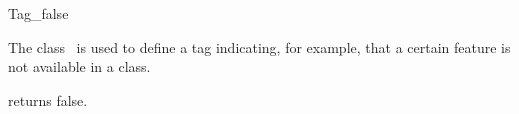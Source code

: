 \begin{ccRefClass}{Tag_false}

\ccDefinition

The class \ccRefName\ is used to define a tag indicating, for example,
that a certain feature is not available in a class.


{returns false.}

\ccSeeAlso
{} \\

\end{ccRefClass}
